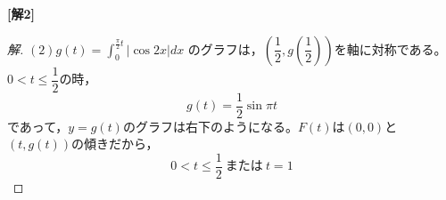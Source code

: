 \documentclass[../main.tex]{subfiles}
\begin{document}
\bigskip
\noindent\textbf{[解2]}

\begin{proof}[解]
  $(2)$\quad $g(t)=\displaystyle\int_0^{\frac{\pi}{2}t}|\cos2x|dx$ のグラフは，$\left(\dfrac12,g\left(\dfrac12\right)\right)$を軸に対称である。$0<t\le\dfrac12$の時，
  \[
    g(t)=\frac12\sin\pi t
  \]
  であって，$y=g(t)$のグラフは右下のようになる。$F(t)$は$(0,0)$と$(t,g(t))$の傾きだから，
  \[
    0<t\le\frac12 \ \text{または}\ t=1
  \]
\end{proof}
\end{document}
